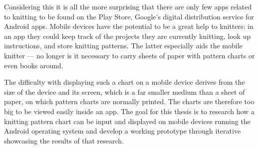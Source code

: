 Considering this it is all the more surprising that there are only few apps related to knitting to be found on the Play Store, Google's digital distribution service for Android apps. Mobile devices have the potential to be a great help to knitters: in an app they could keep track of the projects they are currently knitting, look up instructions, and store knitting patterns. The latter especially aids the mobile knitter --- no longer is it necessary to carry sheets of paper with pattern charts or even books around.

The difficulty with displaying such a chart on a mobile device derives from the size of the device and its screen, which is a far smaller medium than a sheet of paper, on which pattern charts are normally printed. The charts are therefore too big to be viewed easily inside an app. The goal for this thesis is to research how a knitting pattern chart can be input and displayed on mobile devices running the Android operating system and develop a working prototype through iterative showcasing the results of that research. 